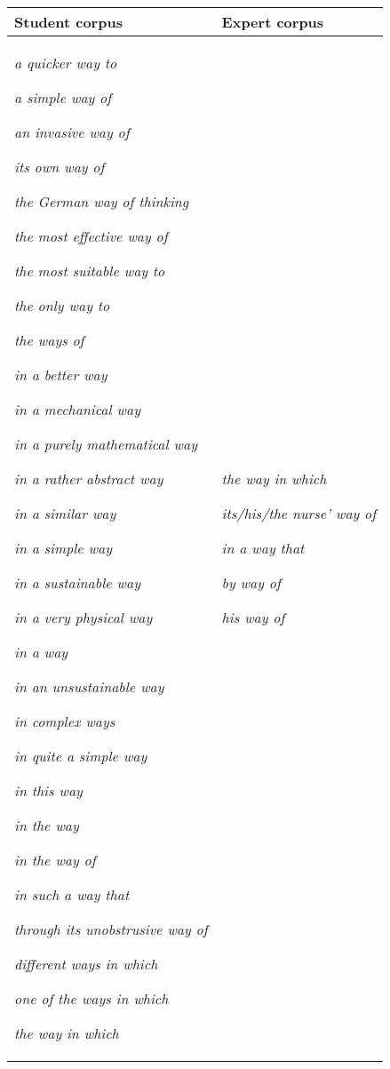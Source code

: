 \begin{center}
\tablefirsthead{}
\tablehead{}
\tabletail{}
\tablelasttail{}
\begin{supertabular}{m{2.2726598in}m{2.2893598in}}
\hline
Student corpus  &
Expert corpus\\\hline
\textit{a quicker way to }

\textit{a simple way of}

\textit{an invasive way of}

\textit{its own way of}

\textit{the German way of thinking}

\textit{the most effective way of}

\textit{the most suitable way to}

\textit{the only way to}

\textit{the ways of }

\textit{in a better way }

\textit{in a mechanical way}

\textit{in a purely mathematical way}

\textit{in a rather abstract way}

\textit{in a similar way}

\textit{in a simple way}

\textit{in a sustainable way}

\textit{in a very physical way}

\textit{in a way}

\textit{in an unsustainable way}

\textit{in complex ways}

\textit{in quite a simple way}

\textit{in this way}

\textit{in the way}

\textit{in the way of}

\textit{in such a way that}

\textit{through its unobstrusive way of}

\textit{different ways in which}

\textit{one of the ways in which}

\textit{the way in which} &
\textit{the way in which}

\textit{its/his/the nurse’ way of }

\textit{in a way that}

\textit{by way of}

\textit{his way of }


\end{supertabular}
\end{center}
